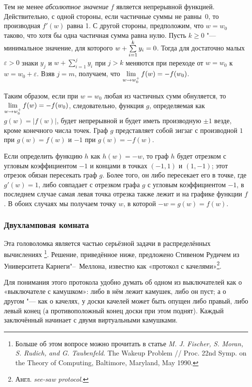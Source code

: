 \documentclass[twoside]{book}
\begin{document}
Тем не менее \emph{абсолютное значение} $f$ является непрерывной функцией.
Действительно, с одной стороны, если частичные суммы не равны~$0$, то производная $f'(w)$ равна 1.
С другой стороны, предположим, что $w=w_0$ таково, что хотя бы одна частичная сумма равна нулю.
Пусть $k\ge0$ "--- минимальное значение, для которого $w+\sum\limits_{i=1}^{k}y_i\z=0$.
Тогда для достаточно малых $\varepsilon>0$
знаки  $y_j$ и $w+\sum\limits_{i=1}^{j}y_i$ при $j>k$ меняются при переходе от $w=w_0$ к $w=w_0+\varepsilon$.
Взяв $j = m$, получаем, что $\lim\limits_{w\to w_0^+}f(w)\z=-f(w_0)$.

Таким образом, если при $w=w_0$ любая из частичных сумм обнуляется, то $\lim\limits_{w\to w_0^+}f(w)\z=-f(w_0)$, следовательно, функция $g$, определяемая как $g(w) =|f(w)|$, будет непрерывной и будет иметь производную $\pm1$ везде, кроме конечного числа точек.
Граф $g$ представляет собой зигзаг с производной $1$ при $g(w)=f(w)$ и $-1$ при $g(w)=-f(w)$.

Если определить функцию $h$ как $h (w) = -w$, то граф $h$ будет отрезком с угловым коэффициентом $-1$ и концами в точках $(-1,1)$ и $(1,-1)$;
этот отрезок обязан пересекать граф $g$.
Более того, он либо пересекает его в точке, где $g'(w) = 1$, либо совпадает с отрезком графа $g$ с угловым коэффициентом $-1$, в последнем случае самая левая точка отрезка также лежит и на графике функции $f$.
В обоих случаях мы получаем точку $w$, в которой $-w = g (w) = f (w)$.
\heart

\subsubsection*{Двухламповая комната}

Эта головоломка является частью серьёзной задачи в распределённых вычислениях%
\footnote{Больше об этом вопросе можно прочитать в статье \emph{M. J. Fischer, S. Moran, S. Rudich, and G. Taubenfeld}. The Wakeup Problem /\!/ {Proc. 22nd Symp. on the Theory of Computing}, Baltimore, Maryland, May 1990.}.
Решение, приведённое ниже, предложено Стивеном Рудичем из Университета Карнеги"--~Меллона, известно как «протокол с качелями»\footnote{Англ. \emph{see-saw protocol}.}.

\medskip

Для понимания этого протокола удобно думать об одном из выключателей как о «выключателе с камушком»: либо в нём лежит камушек, либо он пуст; а о другом "--- как о качелях, у доски качелей может быть опущен либо правый, либо  левый конец (а противоположный конец доски при этом поднят).
Каждый заключённый начинает с двумя виртуальными камушками.
\end{document}
